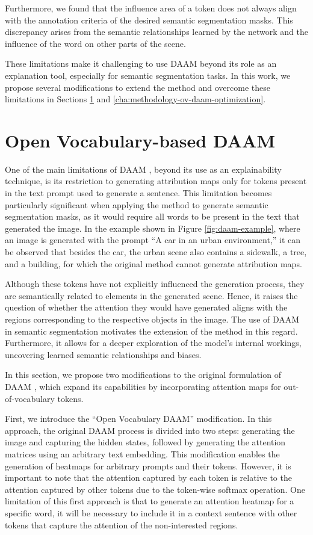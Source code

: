 Furthermore, we found that the influence area of a token does not always align with the annotation criteria of the desired semantic segmentation masks. This discrepancy arises from the semantic relationships learned by the network and the influence of the word on other parts of the scene.

These limitations make it challenging to use DAAM beyond its role as an explanation tool, especially for semantic segmentation tasks. In this work, we propose several modifications to extend the method and overcome these limitations in Sections \ref{cha:methodology-ov-daam} and \ref{cha:methodology-ov-daam-optimization}.


\section{Open Vocabulary-based DAAM}
\label{cha:methodology-ov-daam}

One of the main limitations of DAAM \cite{DAAM}, beyond its use as an explainability technique, is its restriction to generating attribution maps only for tokens present in the text prompt used to generate a sentence. This limitation becomes particularly significant when applying the method to generate semantic segmentation masks, as it would require all words to be present in the text that generated the image. In the example shown in Figure \ref{fig:daam-example}, where an image is generated with the prompt ``A car in an urban environment,'' it can be observed that besides the car, the urban scene also contains a sidewalk, a tree, and a building, for which the original method cannot generate attribution maps.

Although these tokens have not explicitly influenced the generation process, they are semantically related to elements in the generated scene. Hence, it raises the question of whether the attention they would have generated aligns with the regions corresponding to the respective objects in the image. The use of DAAM in semantic segmentation motivates the extension of the method in this regard. Furthermore, it allows for a deeper exploration of the model's internal workings, uncovering learned semantic relationships and biases.

In this section, we propose two modifications to the original formulation of 
DAAM \cite{DAAM}, which expand its capabilities by incorporating attention maps for out-of-vocabulary tokens.

First, we introduce the ``Open Vocabulary DAAM'' modification. In this approach, the original DAAM process is divided into two steps: generating the image and capturing the hidden states, followed by generating the attention matrices using an arbitrary text embedding. This modification enables the generation of heatmaps for arbitrary prompts and their tokens. However, it is important to note that the attention captured by each token is relative to the attention captured by other tokens due to the token-wise softmax operation. One limitation of this first approach is that to generate an attention heatmap for a specific word, it will be necessary to include it in a context sentence with other tokens that capture the attention of the non-interested regions.

